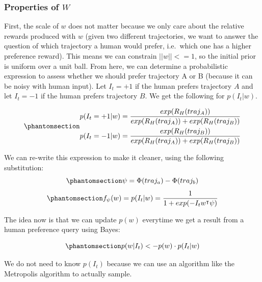 \documentclass[
  letterpaper,
  numbers=noenddot,
  DIV=11]{scrreprt}
\theoremstyle{definition}
\theoremstyle{plain}
\theoremstyle{plain}
\theoremstyle{remark}
\begin{document}
\subsubsection*{\texorpdfstring{Properties of
\(W\)}{Properties of W}}\label{properties-of-w}

First, the scale of \(w\) does not matter because we only care about the
relative rewards produced with \(w\) (given two different trajectories,
we want to answer the question of which trajectory a human would prefer,
i.e.~which one has a higher preference reward). This means we can
constrain \(||w|| <= 1\), so the initial prior is uniform over a unit
ball. From here, we can determine a probabilistic expression to assess
whether we should prefer trajectory A or B (because it can be noisy with
human input). Let \(I_t = +1\) if the human prefers trajectory \(A\) and
let \(I_t = -1\) if the human prefers trajectory \(B\). We get the
following for \(p(I_t | w)\).

\begin{equation}\phantomsection\label{eq-eq3.37}{\begin{aligned}
p(I_t = +1|w) &= \frac{exp(R_H(traj_A))}{exp(R_H(traj_A)) + exp(R_H(traj_B))}\\
p(I_t = -1|w) &= \frac{exp(R_H(traj_B))}{exp(R_H(traj_A)) + exp(R_H(traj_B))}
\end{aligned}}\end{equation}

We can re-write this expression to make it cleaner, using the following
substitution:
\begin{equation}\phantomsection\label{eq-eq3.38}{\psi = \Phi(traj_a) - \Phi(traj_b)}\end{equation}
\begin{equation}\phantomsection\label{eq-eq3.39}{f_{\psi} (w) = p(I_t|w) = \frac{1}{1 + exp(-I_tw^{\intercal}\psi)}}\end{equation}

The idea now is that we can update \(p(w)\) everytime we get a result
from a human preference query using Bayes:

\begin{equation}\phantomsection\label{eq-eq3.40}{p(w|I_t) <- p(w) \cdot p(I_t|w)}\end{equation}

We do not need to know \(p(I_t)\) because we can use an algorithm like
the Metropolis algorithm to actually sample.
\end{document}
